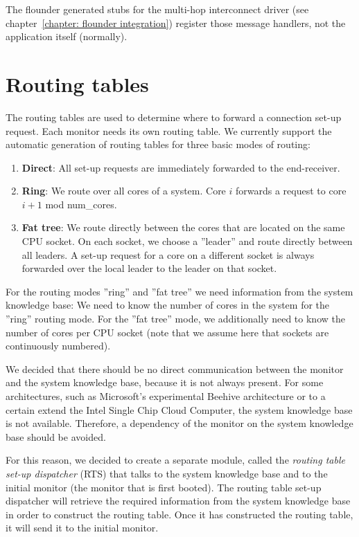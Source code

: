 \documentclass[a4paper,twoside]{report} %
\begin{document}
The flounder generated stubs for the multi-hop interconnect driver (see chapter~\ref{chapter: flounder integration}) register those message handlers, not the application itself (normally).

\section{Routing tables}
\label{sec: routing tables}
The routing tables are used to determine where to forward a connection set-up request. Each monitor needs its own routing table. We currently support the automatic generation of routing tables for three basic modes of routing:

\begin{enumerate}
\item \textbf{Direct}: All set-up requests are immediately forwarded to the end-receiver.

\item \textbf{Ring}: We route over all cores of a system. Core $i$ forwards a request to core $i+1$ mod num\_cores.

\item \textbf{Fat tree}: We route directly between the cores that are located on the same CPU socket. On each socket, we choose a ''leader'' and route directly between all leaders. A set-up request for a core on a different socket is always forwarded over the local leader to the leader on that socket.
\end{enumerate} 

For the routing modes ''ring'' and ''fat tree'' we need information from the system knowledge base: We need to know the number of cores in the system for the ''ring'' routing mode. For the ''fat tree'' mode, we additionally need to know the number of cores per CPU socket (note that we assume here that sockets are continuously numbered). 

We decided that there should be no direct communication between the monitor and the system knowledge base, because it is not always present. For some architectures, such as Microsoft's experimental Beehive architecture or to a certain extend the Intel Single Chip Cloud Computer, the system knowledge base is not available. Therefore, a dependency of the monitor on the system knowledge base should be avoided.

For this reason, we decided to create a separate module, called the \emph{routing table set-up dispatcher} (RTS) that talks to the system knowledge base and to the initial monitor (the monitor that is first booted). The routing table set-up dispatcher will retrieve the required information from the system knowledge base in order to construct the routing table. Once it has constructed the routing table, it will send it to the initial monitor. 
\end{document}
